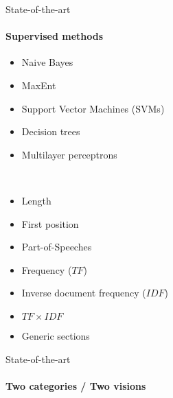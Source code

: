   \begin{frame}{State-of-the-art}
    \framesubtitle{Supervised methods}

    \begin{itemize}
      \item{Naive Bayes\hfill\cite{witten1999kea}}
      \item<+->{MaxEnt\hfill\cite{sujian2003maximumentropy}}
      \item<+->{Support Vector Machines (SVMs)\hfill\cite{zhang2006svm}}
      \item<+->{Decision trees\hfill\cite{ercan2007lexicalchains}}
      \item<+->{Multilayer perceptrons\hfill\cite{sarkar2010neuralnetwork}}
    \end{itemize}~\\

    \vspace{-.75em}
    \begin{multicols}{3}
      \begin{itemize}
        \item<6->{Length}
        \item<+->{First position}
        \item<+->{Part-of-Speeches}
        \item<+->{Frequency ($TF$)}
        \item<+->{Inverse document frequency ($IDF$)}
        \item<+->{$TF \times IDF$}
        \item<+->{Generic sections}
      \end{itemize}
    \end{multicols}

  \end{frame}

  \begin{frame}{State-of-the-art}
    \framesubtitle{Two categories / Two visions}



  \end{frame}

